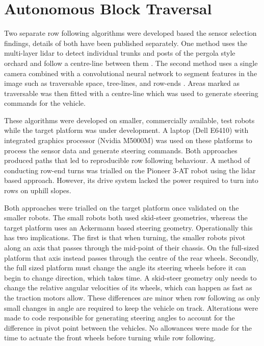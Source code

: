 \documentclass[preprint,authoryear,12pt]{elsarticle}
\begin{document}
\section{Autonomous Block Traversal}
\label{sect:autonomous}
    Two separate row following algorithms were developed based the sensor selection findings, details of both have been published separately.
    One method uses the multi-layer lidar to detect individual trunks and posts of the pergola style orchard and follow a centre-line between them \citep{Bell2016}.
    The second method uses a single camera combined with a convolutional neural network to segment features in the image such as traversable space, tree-lines, and row-ends \citep{Bell2017}.
    Areas marked as traversable was then fitted with a centre-line which was used to generate steering commands for the vehicle.

    These algorithms were developed on smaller, commercially available, test robots while the target platform was under development.
    A laptop (Dell E6410) with integrated graphics processor (Nvidia M5000M) was used on these platforms to process the sensor data and generate steering commands.
    Both approaches produced paths that led to reproducible row following behaviour.
    A method of conducting row-end turns was trialled on the Pioneer 3-AT robot using the lidar based approach.
    However, its drive system lacked the power required to turn into rows on uphill slopes.

    Both approaches were trialled on the target platform once validated on the smaller robots.
    The small robots both used skid-steer geometries, whereas the target platform uses an Ackermann based steering geometry.
    Operationally this has two implications.
    The first is that when turning, the smaller robots pivot along an axis that passes through the mid-point of their chassis.
    On the full-sized platform that axis instead passes through the centre of the rear wheels.
    Secondly, the full sized platform must change the angle its steering wheels before it can begin to change direction, which takes time.
    A skid-steer geometry only needs to change the relative angular velocities of its wheels, which can happen as fast as the traction motors allow.
    These differences are minor when row following as only small changes in angle are required to keep the vehicle on track.
    Alterations were made to code responsible for generating steering angles to account for the difference in pivot point between the vehicles.
    No allowances were made for the time to actuate the front wheels before turning while row following.
\end{document}
